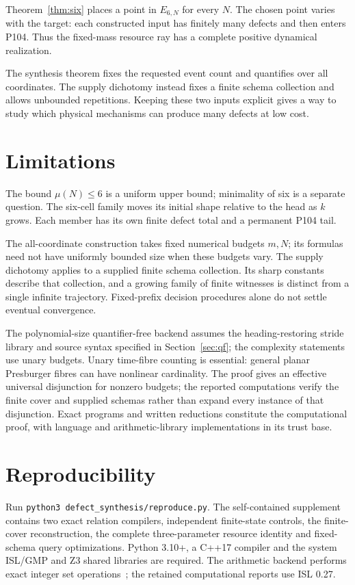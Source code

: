 \documentclass[11pt]{article}
\theoremstyle{remark}\newtheorem{remark}[theorem]{Remark}
\begin{document}
Theorem~\ref{thm:six} places a point in $E_{6,N}$ for every $N$. The chosen point varies with the target: each constructed input has finitely many defects and then enters P104. Thus the fixed-mass resource ray has a complete positive dynamical realization.

The synthesis theorem fixes the requested event count and quantifies over
all coordinates. The supply dichotomy instead fixes a finite schema collection
and allows unbounded repetitions. Keeping these two inputs explicit gives a
way to study which physical mechanisms can produce many defects at low cost.

\section{Limitations}
The bound $\mu(N)\le6$ is a uniform upper bound; minimality of six is a separate
question. The six-cell family moves its initial shape relative to the head as
$k$ grows. Each member has its own finite defect total and a permanent P104 tail.

The all-coordinate construction takes fixed numerical budgets $m,N$;
its formulas need not have uniformly bounded size when these budgets vary.
The supply dichotomy applies to a supplied finite schema collection. Its
sharp constants describe that collection, and a growing family of finite
witnesses is distinct from a single infinite trajectory. Fixed-prefix
decision procedures alone do not settle eventual convergence.

The polynomial-size quantifier-free backend assumes the heading-restoring
stride library and source syntax specified in Section~\ref{sec:qf}; the
complexity statements use unary budgets. Unary time-fibre counting is
essential: general planar Presburger fibres can have nonlinear cardinality.
The proof gives an effective universal disjunction for nonzero budgets;
the reported computations verify the finite cover and supplied schemas
rather than expand every instance of that disjunction. Exact programs and
written reductions constitute the computational proof, with language and
arithmetic-library implementations in its trust base.

\section{Reproducibility}
Run \texttt{python3 defect\_synthesis/reproduce.py}. The self-contained
supplement contains two exact relation compilers, independent finite-state
controls, the finite-cover reconstruction, the complete three-parameter
resource identity and fixed-schema query optimizations. Python 3.10+, a C++17
compiler and the system ISL/GMP and Z3 shared libraries are required. The arithmetic
backend performs exact integer set operations~\cite{isl}; the retained
computational reports use ISL 0.27.
\end{document}
